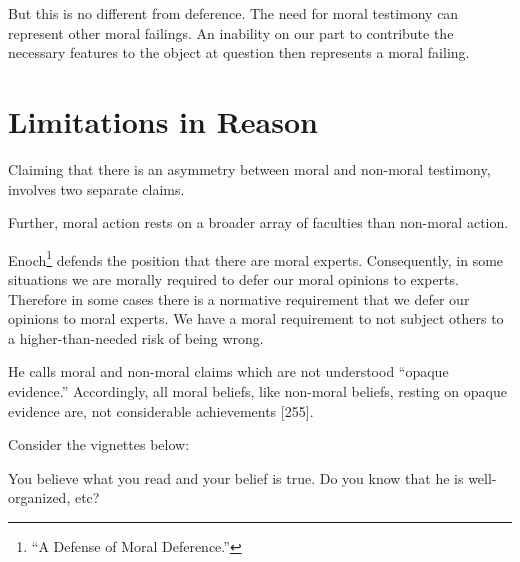 \documentclass[phdthesis,12pt,final]{wuthesis}
\theoremstyle{definition}
\theoremstyle{definition}
\theoremstyle{definition}
\theoremstyle{definition}
\theoremstyle{remark}
\begin{document}
But this is no different from deference. The need for moral testimony can represent other moral failings. An inability on our part to contribute the necessary features to the object at question then represents a moral failing.

\section{Limitations in Reason}\label{limitations-in-reason}

Claiming that there is an asymmetry between moral and non-moral testimony, involves two separate claims.

\begin{Shaded}
\begin{Highlighting}[]

\end{Highlighting}
\end{Shaded}

Further, moral action rests on a broader array of faculties than non-moral action.

Enoch\footnote{{``A {Defense} of {Moral Deference}.''}} defends the position that there are moral experts. Consequently, in some situations we are morally required to defer our moral opinions to experts. Therefore in some cases there is a normative requirement that we defer our opinions to moral experts. We have a moral requirement to not subject others to a higher-than-needed risk of being wrong.

He calls moral and non-moral claims which are not understood ``opaque evidence.'' Accordingly, all moral beliefs, like non-moral beliefs, resting on opaque evidence are, not considerable achievements {[}255{]}.

Consider the vignettes below:

\begin{Shaded}
\begin{Highlighting}[]

\end{Highlighting}
\end{Shaded}

You believe what you read and your belief is true. Do you know that he is well-organized, etc?
\end{document}

